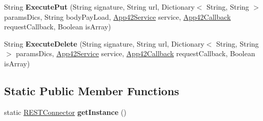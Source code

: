 \begin{DoxyCompactItemize}
\item 
\hypertarget{classcom_1_1shephertz_1_1app42_1_1paas_1_1sdk_1_1windows_1_1connection_1_1_r_e_s_t_connector_a4c1f15b18e165e870c8c61c41d405985}{String {\bfseries Execute\+Put} (String signature, String url, Dictionary$<$ String, String $>$ params\+Dics, String body\+Pay\+Load, \hyperlink{classcom_1_1shephertz_1_1app42_1_1paas_1_1sdk_1_1windows_1_1_app42_service}{App42\+Service} service, \hyperlink{interfacecom_1_1shephertz_1_1app42_1_1paas_1_1sdk_1_1windows_1_1_app42_callback}{App42\+Callback} request\+Callback, Boolean is\+Array)}\label{classcom_1_1shephertz_1_1app42_1_1paas_1_1sdk_1_1windows_1_1connection_1_1_r_e_s_t_connector_a4c1f15b18e165e870c8c61c41d405985}

\item 
\hypertarget{classcom_1_1shephertz_1_1app42_1_1paas_1_1sdk_1_1windows_1_1connection_1_1_r_e_s_t_connector_af0b5787086e35e4244d0e85de79da550}{String {\bfseries Execute\+Delete} (String signature, String url, Dictionary$<$ String, String $>$ params\+Dics, \hyperlink{classcom_1_1shephertz_1_1app42_1_1paas_1_1sdk_1_1windows_1_1_app42_service}{App42\+Service} service, \hyperlink{interfacecom_1_1shephertz_1_1app42_1_1paas_1_1sdk_1_1windows_1_1_app42_callback}{App42\+Callback} request\+Callback, Boolean is\+Array)}\label{classcom_1_1shephertz_1_1app42_1_1paas_1_1sdk_1_1windows_1_1connection_1_1_r_e_s_t_connector_af0b5787086e35e4244d0e85de79da550}

\end{DoxyCompactItemize}
\subsection*{Static Public Member Functions}
\begin{DoxyCompactItemize}
\item 
\hypertarget{classcom_1_1shephertz_1_1app42_1_1paas_1_1sdk_1_1windows_1_1connection_1_1_r_e_s_t_connector_a5dcb6c60ba31628285bc56100bff06d4}{static \hyperlink{classcom_1_1shephertz_1_1app42_1_1paas_1_1sdk_1_1windows_1_1connection_1_1_r_e_s_t_connector}{R\+E\+S\+T\+Connector} {\bfseries get\+Instance} ()}\label{classcom_1_1shephertz_1_1app42_1_1paas_1_1sdk_1_1windows_1_1connection_1_1_r_e_s_t_connector_a5dcb6c60ba31628285bc56100bff06d4}

\end{DoxyCompactItemize}
